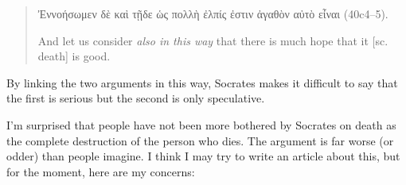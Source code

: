 \documentclass[11pt]{article}
\begin{document}
\begin{quote}
    Ἐννοήσωμεν δὲ καὶ τῇδε ὡς πολλὴ ἐλπίς ἐστιν ἀγαθὸν αὐτὸ εἶναι (40c4--5).

    And let us consider \emph{also in this way} that there is much hope that it [sc. death] is good.
\end{quote}

By linking the two arguments in this way, Socrates makes it difficult to say that the first is serious but the second is only speculative.

I'm surprised that people have not been more bothered by Socrates on death as the complete destruction of the person who dies.  The argument is far worse (or odder) than people imagine.  I think I may try to write an article about this, but for the moment, here are my concerns:
\end{document}
